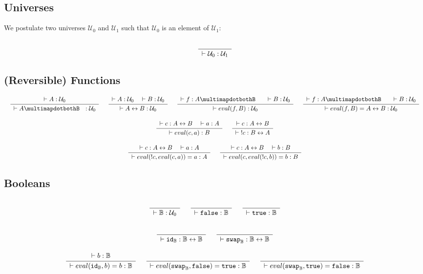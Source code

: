 \documentclass[format=acmlarge,review,natbib]{acmart}
\newcommand{\invc}[1]{!#1}
\newcommand{\evalone}[2]{eval(#1,#2)}
\newcommand{\idc}{\mathtt{id}}
\newcommand{\swapc}{\mathtt{swap}}
\newcommand{\iso}{\leftrightarrow}
\newcommand{\piso}{\multimapdotbothB~~}
\newcommand{\fc}{\mathtt{false}}
\newcommand{\tc}{\mathtt{true}}
\newcommand{\boolt}{\mathbb{B}}
\newcommand{\uzero}{\mathcal{U}_0}
\newcommand{\uone}{\mathcal{U}_1}
\newcommand{\Rule}[2]{
\makebox{
$\displaystyle
\frac{\begin{array}{l}#1\\\end{array}}
{\begin{array}{l}#2\\\end{array}}$}}
\newcommand{\proves}{\vdash}
\newcommand{\jdg}[3]{#1 \proves #2 : #3}
\begin{document}
\subsection{Universes}

We postulate two universes $\uzero$ and $\uone$ such that $\uzero$ is an element
of $\uone$:

\[
\Rule{}{\jdg{}{\uzero}{\uone}}
\]

\subsection{(Reversible) Functions}

\[\begin{array}{c}
\Rule{\jdg{}{A}{\uzero}}
        {\jdg{}{A\piso}{\uzero}}
\quad
\Rule{\jdg{}{A}{\uzero}
         \quad \jdg{}{B}{\uzero}}
        {\jdg{}{A\iso B}{\uzero}}
\quad
\Rule{\jdg{}{f}{A \piso}
         \quad\jdg{}{B}{\uzero}}
        {\jdg{}{\evalone{f}{B}}{\uzero}}
\quad
\Rule{\jdg{}{f}{A \piso}
         \quad\jdg{}{B}{\uzero}}
        {\jdg{}{\evalone{f}{B} = A \iso B}{\uzero}}
\\
\\
\Rule{\jdg{}{c}{A \iso B}
         \quad\jdg{}{a}{A}}
        {\jdg{}{\evalone{c}{a}}{B}}
\quad
\Rule{\jdg{}{c}{A \iso B}}
        {\jdg{}{\;\invc{c}}{B \iso A}}
\\
\\
\Rule{\jdg{}{c}{A \iso B}
         \quad\jdg{}{a}{A}}
        {\jdg{}{\evalone{\invc{c}}{\evalone{c}{a}} = a}{A}}
\quad
\Rule{\jdg{}{c}{A \iso B}
         \quad\jdg{}{b}{B}}
        {\jdg{}{\evalone{c}{\evalone{\invc{c}}{b}} = b}{B}}
\end{array}\]

\subsection{Booleans}

\[\begin{array}{c}
\Rule{}{\jdg{}{\boolt}{\uzero}}
\quad
\Rule{}{\jdg{}{\fc}{\boolt}}
\quad
\Rule{}{\jdg{}{\tc}{\boolt}}
\\
\\
\Rule{}{\jdg{}{\idc_{\boolt}}{\boolt\iso\boolt}}
\quad
\Rule{}{\jdg{}{\swapc_{\boolt}}{\boolt\iso\boolt}}
\\
\\
\Rule{\jdg{}{b}{\boolt}}
        {\jdg{}{\evalone{\idc_{\boolt}}{b} = b}{\boolt}}
\quad
\Rule{}
        {\jdg{}{\evalone{\swapc_{\boolt}}{\fc} = \tc}{\boolt}}
\quad
\Rule{}
        {\jdg{}{\evalone{\swapc_{\boolt}}{\tc} = \fc}{\boolt}}
\end{array}\]
\end{document}
